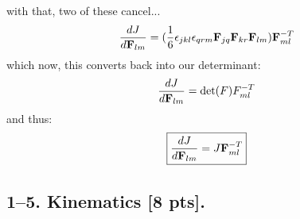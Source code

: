 with that, two of these cancel...
\begin{equation}
    \frac{dJ}{d\mathbf{F}_{lm}} = (\frac{1}{6}\epsilon_{jkl}\epsilon_{qrm}\mathbf{F}_{jq}\mathbf{F}_{kr}\mathbf{F}_{lm})\mathbf{F}^{-T}_{ml}
\end{equation}
which now, this converts back into our determinant:
\begin{equation}
    \frac{dJ}{d\mathbf{F}_{lm}} = \det(F)F^{-T}_{ml}
\end{equation}
and thus:
\begin{equation}
    \boxed{\frac{dJ}{d\mathbf{F}_{lm}} = J \mathbf{F}^{-T}_{ml}}
\end{equation}

\bigskip
\subsection*{1--5. \textbf{Kinematics} [8 pts].} 
